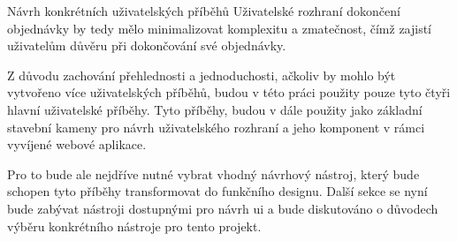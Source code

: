 \begin{subsection}{Návrh konkrétních uživatelských příběhů}
    Uživatelské rozhraní dokončení objednávky by tedy mělo minimalizovat komplexitu a zmatečnost, čímž zajistí uživatelům důvěru při dokončování své objednávky.

    Z důvodu zachování přehlednosti a jednoduchosti, ačkoliv by mohlo být vytvořeno více uživatelských příběhů, budou v této práci použity pouze tyto čtyři hlavní uživatelské příběhy.
    Tyto příběhy, budou v dále použity jako základní stavební kameny pro návrh uživatelského rozhraní a jeho komponent v rámci vyvíjené webové aplikace.

    Pro to bude ale nejdříve nutné vybrat vhodný návrhový nástroj, který bude schopen tyto příběhy transformovat do funkčního designu.
    Další sekce se nyní bude zabývat nástroji dostupnými pro návrh \ac{ui} a bude diskutováno o důvodech výběru konkrétního nástroje pro tento projekt.
\end{subsection}
